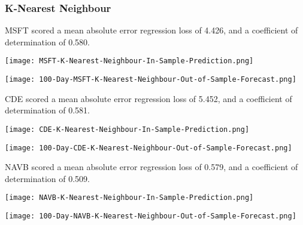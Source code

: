 \subsubsection{K-Nearest Neighbour}
MSFT scored a mean absolute error regression loss of 4.426, and a coefficient of determination of 0.580.

\begin{center}
    \texttt{[image: MSFT-K-Nearest-Neighbour-In-Sample-Prediction.png]}
    \label{fig:nonfloat}
\end{center}

\begin{center}  
    \texttt{[image: 100-Day-MSFT-K-Nearest-Neighbour-Out-of-Sample-Forecast.png]}
    \label{fig:nonfloat}
\end{center}

CDE scored a mean absolute error regression loss of 5.452, and a coefficient of determination of 0.581.

\begin{center}
    \texttt{[image: CDE-K-Nearest-Neighbour-In-Sample-Prediction.png]}
    \label{fig:nonfloat}
\end{center}

\begin{center}  
    \texttt{[image: 100-Day-CDE-K-Nearest-Neighbour-Out-of-Sample-Forecast.png]}
    \label{fig:nonfloat}
\end{center}

NAVB scored a mean absolute error regression loss of 0.579, and a coefficient of determination of 0.509.

\begin{center}
    \texttt{[image: NAVB-K-Nearest-Neighbour-In-Sample-Prediction.png]}
    \label{fig:nonfloat}
\end{center}

\begin{center}  
    \texttt{[image: 100-Day-NAVB-K-Nearest-Neighbour-Out-of-Sample-Forecast.png]}
    \label{fig:nonfloat}
\end{center}

